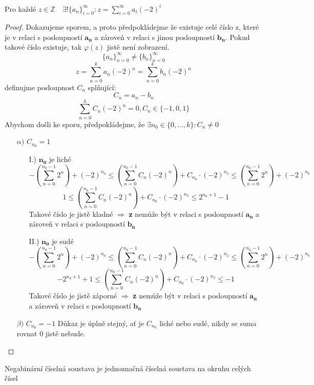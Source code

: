 \documentclass[czech,bachelor,dept470,male]{diploma}
\begin{document}
\begin{theorem}
	Pro každé $z\in\mathbb{Z}\quad\exists!\{a_n\}_{i=0}^\infty:z=\sum_{i=0}^{\infty}a_i(-2)^i$
\end{theorem}
\begin{proof}
	Dokazujeme sporem, a proto předpokládejme že existuje celé číslo z, které je v relaci s posloupností $\mathbf{a_n}$ a zároveň v relaci s jinou posloupností $\mathbf{b_n}$. Pokud takové číslo existuje, tak $\varphi(z)$ jistě není zobrazení.
	$$\{a_n\}_{n=0}^\infty \ne \{b_n\}_{n=0}^\infty$$ $$z=\sum_{n=0}^{k}a_n(-2)^n = \sum_{n=0}^{k}b_n(-2)^n$$
	definujme posloupnost $C_n$ splňující: $$C_n = a_n - b_n$$
	$$\sum_{n=0}^k C_n(-2)^n = 0 , C_n \in \{-1, 0 ,1\}$$
	Abychom došli ke sporu, předpokládejme, že $\exists n_0 \in \{0,\dots,k\}: C_n \ne 0$
	\begin{itemize}
		\item[$\alpha)$]$C_{n_0} = 1$
		\begin{itemize}
			\item[I.)] $\mathbf{n_0}$ je liché
			$$-\left(\sum_{n=0}^{n_0-1}2^n\right)+(-2)^{n_0}\leq \left(\sum_{n=0}^{n_0-1}C_n(-2)^n\right)+C_{n_0}\cdot(-2)^{n_2}  \leq\left(\sum_{n=0}^{n_0-1}2^n\right)+(-2)^{n_0}$$
			$$1\leq \left(\sum_{n=0}^{n_0-1}C_n(-2)^n\right)+C_{n_0}\cdot(-2)^{n_2}  \leq 2^{n_0 + 1}-1$$
			Takové číslo je jistě kladné $\Rightarrow$ \textbf{z} nemůže být v relaci s posloupností $\mathbf{a_n}$ a zároveň v relaci s posloupností $\mathbf{b_n}$
			\item[II.)]  $\mathbf{n_0}$ je sudé
			$$-\left(\sum_{n=0}^{n_0-1}2^n\right)+(-2)^{n_0}\leq \left(\sum_{n=0}^{n_0-1}C_n(-2)^n\right)+C_{n_0}\cdot(-2)^{n_2}  \leq\left(\sum_{n=0}^{n_0-1}2^n\right)+(-2)^{n_0}$$
			$$-2^{n_0+1}+1\leq \left(\sum_{n=0}^{n_0-1}C_n(-2)^n\right)+C_{n_0}\cdot(-2)^{n_2}  \leq -1$$
			Takové číslo je jistě záporné $\Rightarrow$ \textbf{z} nemůže být v relaci s posloupností $\mathbf{a_n}$ a zároveň v relaci s posloupností $\mathbf{b_n}$
			
		\end{itemize}
		\item[$\beta)$]$C_{n_0} = -1$\newline
		Důkaz je úplně stejný, ať je $C_{n_0}$ liché nebo sudé, nikdy se suma rovnat 0 jistě nebude.
	\end{itemize}
	
\end{proof}

\begin{theorem}
	Negabinární číselná soustava je jednoznačná číselná soustava na okruhu celých čísel
\end{theorem}
\end{document}
